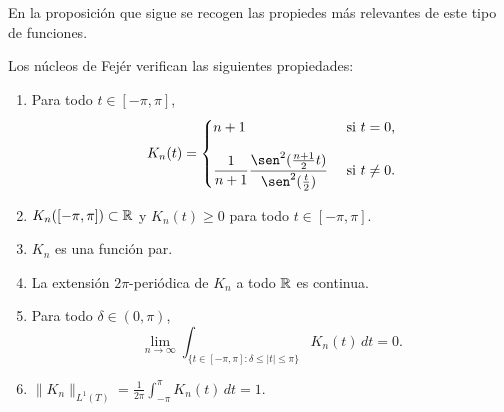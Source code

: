 \documentclass[a4paper, 11pt, oneside]{report}
\begin{document}
En la proposición que sigue se recogen las propiedes más relevantes de este tipo de funciones.

\begin{proposition}\label{pro:4.3.4}
  Los núcleos de Fejér verifican las siguientes propiedades:
  \begin{enumerate}
    \item Para todo $t \in [-\pi,\pi]$, 
    \[ K_n(t) = \begin{cases}
      n+1 & $ si $ t = 0, \\[10pt]
      \displaystyle \frac{1}{n+1}\frac{\sen^2(\frac{n+1}{2}t)}{\sen^2(\frac{t}{2})} & $ si $ t \neq 0.
    \end{cases}\]
    \item $K_n([-\pi,\pi]) \subset \mathbb R$ y $K_n(t) \geq 0$ para todo $t \in [-\pi,\pi]$.
    \item $K_n$ es una función par.
    \item La extensión $2\pi$-periódica de $K_n$ a todo $\mathbb R$ es continua.
    \item Para todo $\delta \in (0,\pi)$,
    \[\lim_{n \to \infty} \int_{\{t \in [-\pi,\pi] \colon \delta \leq |t| \leq \pi\}} K_n(t) \, dt = 0.\]
    \item $\displaystyle \|K_n\|_{L^1(T)}= \frac{1}{2\pi}\int_{-\pi}^\pi K_n(t) \, dt = 1.$
  \end{enumerate}
\end{proposition}
\end{document}
